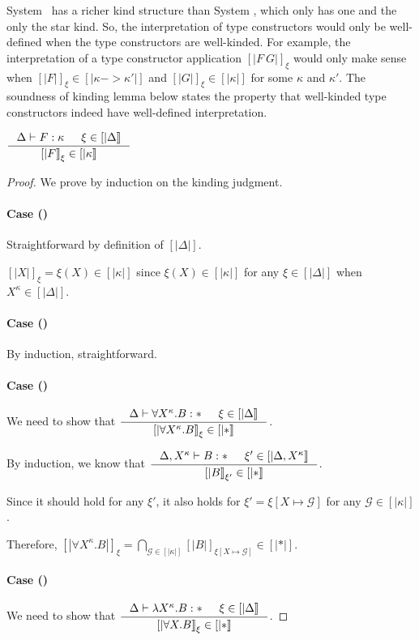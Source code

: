 System \Fw\ has a richer kind structure than System \F, which only has one and
the only the star kind. So, the interpretation of type constructors would only
be well-defined when the type constructors are well-kinded. For example,
the interpretation of a type constructor application $[|F~G|]_\xi$
would only make sense when $[|F|]_\xi\in[|\kappa -> \kappa'|]$
and $[|G|]_\xi\in[|\kappa|]$ for some $\kappa$ and $\kappa'$.
The soundness of kinding lemma below states the property that
well-kinded type constructors indeed have well-defined interpretation.
\begin{lemma}  \label{lem:fw:soundki}
$ \inference{\Delta |- F : \kappa & \xi\in[|\Delta|]}{[|F|]_\xi\in[|\kappa|]} $
\end{lemma}
\begin{proof}
We prove by induction on the kinding judgment.
\paragraph{Case ()}
Straightforward by definition of $[|\Delta|]$.

$[|X|]_\xi=\xi(X) \in [|\kappa|]$
since $\xi(X)\in[|\kappa|]$ for any $\xi\in[|\Delta|]$
when $X^\kappa \in [|\Delta|]$.

\paragraph{Case ()} By induction, straightforward.

\paragraph{Case ()}
We need to show that
$ \inference{\Delta |- \forall X^\kappa.B:* & \xi\in[|\Delta|]}
        {[|\forall X^\kappa.B|]_\xi\in[|*|]} $.

By induction, we know that
$ \inference{\Delta,X^\kappa |- B:* & \xi'\in[|\Delta,X^\kappa|]}
        {[|B|]_{\xi'} \in [|*|]} $.

Since it should hold for any $\xi'$, it also holds for
$\xi'=\xi[X\mapsto\mathcal{G}]$ for any $\mathcal{G}\in[|\kappa|]$.

Therefore,
$  [|\forall X^\kappa.B|]_\xi
 = \bigcap_{\mathcal{G}\in[|\kappa|]}[|B|]_{\xi[X\mapsto\mathcal{G}]}\in[|*|] $.

\paragraph{Case ()}
We need to show that
$ \inference{\Delta |- \l X^\kappa.B:* & \xi\in[|\Delta|]}
        {[|\forall X.B|]_\xi\in[|*|]} $.


\end{proof}
